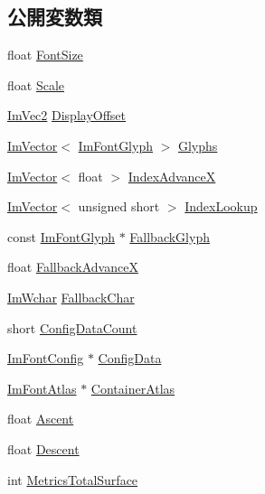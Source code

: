 \subsection*{公開変数類}
\begin{DoxyCompactItemize}
\item 
float \mbox{\hyperlink{struct_im_font_a423e36d1594281f1a5a537e5b0d0a3d4}{Font\+Size}}
\item 
float \mbox{\hyperlink{struct_im_font_ae98fb07fd8862a7243d77b11f38bba19}{Scale}}
\item 
\mbox{\hyperlink{struct_im_vec2}{Im\+Vec2}} \mbox{\hyperlink{struct_im_font_af9b95f3df0b6d45f45903d82301d7f84}{Display\+Offset}}
\item 
\mbox{\hyperlink{class_im_vector}{Im\+Vector}}$<$ \mbox{\hyperlink{struct_im_font_glyph}{Im\+Font\+Glyph}} $>$ \mbox{\hyperlink{struct_im_font_a1a0901fc1a8cbd41d582d6cef4946bc9}{Glyphs}}
\item 
\mbox{\hyperlink{class_im_vector}{Im\+Vector}}$<$ float $>$ \mbox{\hyperlink{struct_im_font_af906476eda06d8a842d0a843a247f530}{Index\+AdvanceX}}
\item 
\mbox{\hyperlink{class_im_vector}{Im\+Vector}}$<$ unsigned short $>$ \mbox{\hyperlink{struct_im_font_aaab48cbf05ca962d71ab3e7b597b992f}{Index\+Lookup}}
\item 
const \mbox{\hyperlink{struct_im_font_glyph}{Im\+Font\+Glyph}} $\ast$ \mbox{\hyperlink{struct_im_font_a0e666b0c49646bd294103f4d288df4b8}{Fallback\+Glyph}}
\item 
float \mbox{\hyperlink{struct_im_font_ad58a5ee4492a3a9fa56f73e5a40d728d}{Fallback\+AdvanceX}}
\item 
\mbox{\hyperlink{imgui_8h_af2c7badaf05a0008e15ef76d40875e97}{Im\+Wchar}} \mbox{\hyperlink{struct_im_font_ae54c2c4184bfcbc7b8f6da9cbc4f93c0}{Fallback\+Char}}
\item 
short \mbox{\hyperlink{struct_im_font_a4a30fc7711d628ad582ccb3188a51ddd}{Config\+Data\+Count}}
\item 
\mbox{\hyperlink{struct_im_font_config}{Im\+Font\+Config}} $\ast$ \mbox{\hyperlink{struct_im_font_afa4eb6cfb979ffa120e9795f328623a1}{Config\+Data}}
\item 
\mbox{\hyperlink{struct_im_font_atlas}{Im\+Font\+Atlas}} $\ast$ \mbox{\hyperlink{struct_im_font_a8a5e0df6be5e3cabe91ae830524db960}{Container\+Atlas}}
\item 
float \mbox{\hyperlink{struct_im_font_a5238ef18f8ad02b783fb8b3a195b708e}{Ascent}}
\item 
float \mbox{\hyperlink{struct_im_font_abcca12aa908bf7105433e7db6088a5e5}{Descent}}
\item 
int \mbox{\hyperlink{struct_im_font_a8087b2ee8b27dcf5c6e30a8318f87cc7}{Metrics\+Total\+Surface}}
\end{DoxyCompactItemize}


